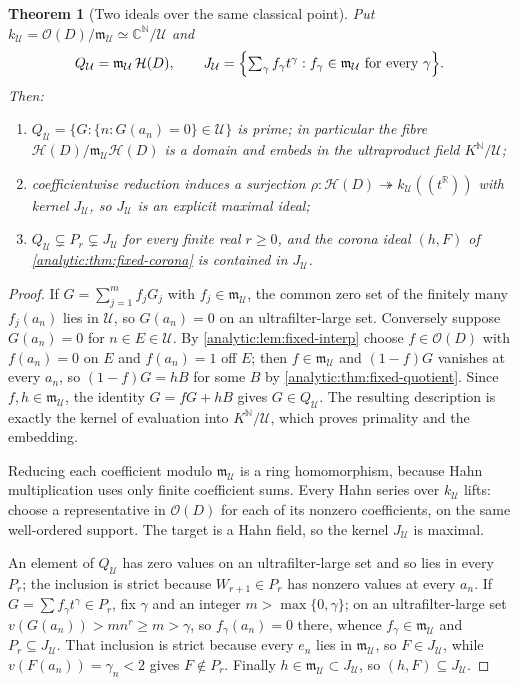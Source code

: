 \documentclass[11pt,letterpaper]{article}
\newtheorem{theorem}{Theorem}[section]
\theoremstyle{definition}
\theoremstyle{remark}
\newcommand{\C}{\mathbb C}
\newcommand{\R}{\mathbb R}
\newcommand{\N}{\mathbb N}
\newcommand{\HH}{\mathcal H}
\newcommand{\UU}{\mathcal U}
\newcommand{\m}{\mathfrak m}
\newcommand{\OO}{\mathcal O}
\numberwithin{equation}{section}
\begin{document}
\begin{theorem}[Two ideals over the same classical point]
\label{analytic:thm:fixed-two-ideals}
Put $k_\UU=\OO(D)/\m_\UU\simeq\C^\N/\UU$ and
\[
 Q_\UU=\m_\UU\,\HH(D),\qquad
 J_\UU=\Bigl\{\textstyle\sum_\gamma f_\gamma t^\gamma:
 f_\gamma\in\m_\UU\ \text{for every}\ \gamma\Bigr\}.
\]
Then:
\begin{enumerate}
\item $Q_\UU=\{G:\{n:G(a_n)=0\}\in\UU\}$ is prime; in particular the fibre
$\HH(D)/\m_\UU\HH(D)$ is a domain and embeds in the ultraproduct field
$K^\N/\UU$;
\item coefficientwise reduction induces a surjection
$\rho:\HH(D)\twoheadrightarrow k_\UU((t^\R))$ with kernel $J_\UU$, so
$J_\UU$ is an explicit maximal ideal;
\item $Q_\UU\subsetneq P_r\subsetneq J_\UU$ for every finite real $r\ge0$,
and the corona ideal $(h,F)$ of \cref{analytic:thm:fixed-corona} is
contained in $J_\UU$.
\end{enumerate}
\end{theorem}
\begin{proof}
If $G=\sum_{j=1}^mf_jG_j$ with $f_j\in\m_\UU$, the common zero set of the
finitely many $f_j(a_n)$ lies in $\UU$, so $G(a_n)=0$ on an
ultrafilter-large set. Conversely suppose $G(a_n)=0$ for $n\in E\in\UU$.
By \cref{analytic:lem:fixed-interp} choose $f\in\OO(D)$ with $f(a_n)=0$ on
$E$ and $f(a_n)=1$ off $E$; then $f\in\m_\UU$ and $(1-f)G$ vanishes at
every $a_n$, so $(1-f)G=hB$ for some $B$ by
\cref{analytic:thm:fixed-quotient}. Since $f,h\in\m_\UU$, the identity
$G=fG+hB$ gives $G\in Q_\UU$. The resulting description is exactly the
kernel of evaluation into $K^\N/\UU$, which proves primality and the
embedding.

Reducing each coefficient modulo $\m_\UU$ is a ring homomorphism, because
Hahn multiplication uses only finite coefficient sums. Every Hahn series
over $k_\UU$ lifts: choose a representative in $\OO(D)$ for each of its
nonzero coefficients, on the same well-ordered support. The target is a
Hahn field, so the kernel $J_\UU$ is maximal.

An element of $Q_\UU$ has zero values on an ultrafilter-large set and so
lies in every $P_r$; the inclusion is strict because $W_{r+1}\in P_r$ has
nonzero values at every $a_n$. If $G=\sum f_\gamma t^\gamma\in P_r$, fix
$\gamma$ and an integer $m>\max\{0,\gamma\}$; on an ultrafilter-large set
$v(G(a_n))>mn^r\ge m>\gamma$, so $f_\gamma(a_n)=0$ there, whence
$f_\gamma\in\m_\UU$ and $P_r\subseteq J_\UU$. That inclusion is strict
because every $e_n$ lies in $\m_\UU$, so $F\in J_\UU$, while
$v(F(a_n))=\gamma_n<2$ gives $F\notin P_r$. Finally $h\in\m_\UU\subset
J_\UU$, so $(h,F)\subseteq J_\UU$.
\end{proof}
\end{document}
